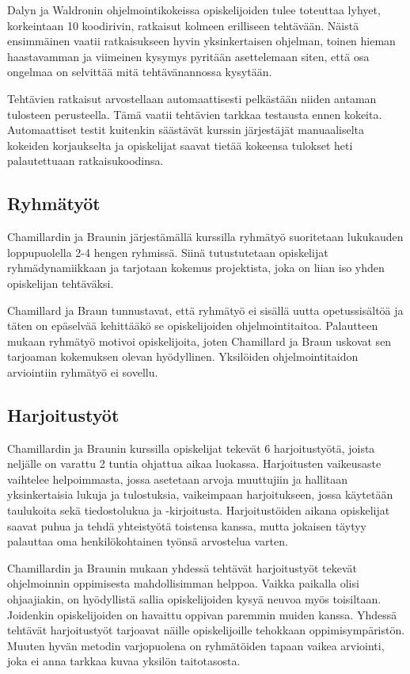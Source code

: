 \documentclass[finnish]{../tktltiki2}
\theoremstyle{definition}
\theoremstyle{remark}
\begin{document}
Dalyn ja Waldronin ohjelmointikokeissa opiskelijoiden tulee toteuttaa lyhyet, korkeintaan 10 koodirivin, ratkaisut kolmeen erilliseen tehtävään. Näistä ensimmäinen vaatii ratkaisukseen hyvin yksinkertaisen ohjelman, toinen hieman haastavamman ja viimeinen kysymys pyritään asettelemaan siten, että osa ongelmaa on selvittää mitä tehtävänannossa kysytään.

Tehtävien ratkaisut arvostellaan automaattisesti pelkästään niiden antaman tulosteen perusteella. Tämä vaatii tehtävien tarkkaa testausta ennen kokeita. Automaattiset testit kuitenkin säästävät kurssin järjestäjät manuaaliselta kokeiden korjaukselta ja opiskelijat saavat tietää kokeensa tulokset heti palautettuaan ratkaisukoodinsa.

\subsection{Ryhmätyöt}

Chamillardin ja Braunin järjestämällä kurssilla ryhmätyö suoritetaan lukukauden loppupuolella 2-4 hengen ryhmissä. Siinä tutustutetaan opiskelijat ryhmädynamiikkaan ja tarjotaan kokemus projektista, joka on liian iso yhden opiskelijan tehtäväksi.

Chamillard ja Braun tunnustavat, että ryhmätyö ei sisällä uutta opetussisältöä ja täten on epäselvää kehittääkö se opiskelijoiden ohjelmointitaitoa. Palautteen mukaan ryhmätyö motivoi opiskelijoita, joten Chamillard ja Braun uskovat sen tarjoaman kokemuksen olevan hyödyllinen. Yksilöiden ohjelmointitaidon arviointiin ryhmätyö ei sovellu.

\subsection{Harjoitustyöt}

Chamillardin ja Braunin kurssilla opiskelijat tekevät 6 harjoitustyötä, joista neljälle on varattu 2 tuntia ohjattua aikaa luokassa. Harjoitusten vaikeusaste vaihtelee helpoimmasta, jossa asetetaan arvoja muuttujiin ja hallitaan yksinkertaisia lukuja ja tulostuksia, vaikeimpaan harjoitukseen, jossa käytetään taulukoita sekä tiedostolukua ja -kirjoitusta. Harjoitustöiden aikana opiskelijat saavat puhua ja tehdä yhteistyötä toistensa kanssa, mutta jokaisen täytyy palauttaa oma henkilökohtainen työnsä arvostelua varten.

Chamillardin ja Braunin mukaan yhdessä tehtävät harjoitustyöt tekevät ohjelmoinnin oppimisesta mahdollisimman helppoa. Vaikka paikalla olisi ohjaajiakin, on hyödyllistä sallia opiskelijoiden kysyä neuvoa myös toisiltaan. Joidenkin opiskelijoiden on havaittu oppivan paremmin muiden kanssa. Yhdessä tehtävät harjoitustyöt tarjoavat näille opiskelijoille tehokkaan oppimisympäristön. Muuten hyvän metodin varjopuolena on ryhmätöiden tapaan vaikea arviointi, joka ei anna tarkkaa kuvaa yksilön taitotasosta.
\end{document}
